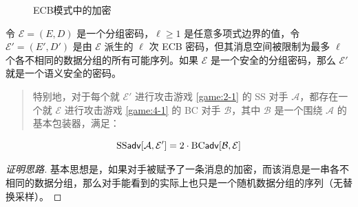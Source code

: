 \begin{figure}
  \centering
  \quad\quad\quad\quad\quad
  \caption{ECB模式中的加密}
  \label{fig:4-5}
\end{figure}

\begin{theorem}\label{theo:4-1}
令 $\mathcal{E}=(E,D)$ 是一个分组密码，$\ell\geq1$ 是任意多项式边界的值，令 $\mathcal{E}'=(E',D')$ 是由 $\mathcal{E}$ 派生的 $\ell$ 次 ECB 密码，但其消息空间被限制为最多 $\ell$ 个各不相同的数据分组的所有可能序列。如果 $\mathcal{E}$ 是一个安全的分组密码，那么 $\mathcal{E}'$ 就是一个语义安全的密码。
\begin{quote}
特别地，对于每个就 $\mathcal{E}'$ 进行攻击游戏 \ref{game:2-1} 的 SS 对手 $\mathcal{A}$，都存在一个就 $\mathcal{E}$ 进行攻击游戏 \ref{game:4-1} 的 BC 对手 $\mathcal{B}$，其中 $\mathcal{B}$ 是一个围绕 $\mathcal{A}$ 的基本包装器，满足：
\end{quote}
\begin{equation}\label{eq:4-3}
{\rm SS\mathsf{adv}}[\mathcal{A},\mathcal{E}']=2\cdot{\rm BC\mathsf{adv}}[\mathcal{B},\mathcal{E}]
\end{equation}
\end{theorem}

\begin{proof}[证明思路]
基本思想是，如果对手被赋予了一条消息的加密，而该消息是一串各不相同的数据分组，那么对手能看到的实际上也只是一个随机数据分组的序列（无替换采样）。
\end{proof}

